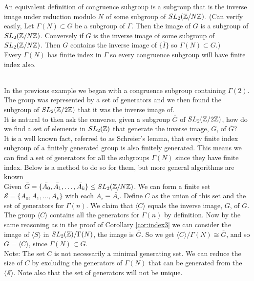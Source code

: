An equivalent definition of congruence subgroup is a subgroup that is the inverse image under reduction modulo $N$ of some subgroup of $\sltznz$. (Can verify easily, Let $\Gamma(N) \subset G$ be a subgroup of $\Gamma$. Then the image of $G$ is a subgroup of $\sltznz$. Conversely if $G$ is the inverse image of some subgroup of $\sltznz$. Then $G$ contains the inverse image of $\{\bar{I}\}$ so $\Gamma(N) \subset G$.)\\
Every $\Gamma(N)$ has finite index in $\Gamma$ so every congruence subgroup will have finite index also. \\
\\
\begin{remark}
In the previous example we began with a congruence subgroup containing $\Gamma(2)$. The group was represented by a set of generators and we then found the subgroup of $\sltznz[2]$ that it was the inverse image of. \\
It is natural to then ask the converse, given a subgroup $\bar{G}$ of $\sltznz[2]$, how do we find a set of elements in $\sltz$ that generate the inverse image, $G$,  of $\bar{G}$? \\

It is a well known fact, referred to as Schreier's lemma, that every finite index subgroup of a finitely generated group is also finitely generated. This means we can find a set of generators for all the subgroups $\Gamma(N)$ since they have finite index. Below is a method to do so for them, but more general algorithms are known \citep{seressPermutation}
\\
Given $\bar{G} = \{\bar{A_0}, \bar{A_1}, \ldots, \bar{A_k}\} \leq \sltznz$. We can form a finite set $\mathcal{S} = \{A_0, A_1, \ldots , A_k\}$ with each $A_i \equiv \bar{A_i}$. Define $C$ as the union of this set and the set of generators for $\Gamma(n)$. We claim that $\langle C \rangle$ equals the inverse image, $G$, of $\bar{G}$. \\
The group $\langle C \rangle$ contains all the generators for $\Gamma(n)$ by definition. Now by the same reasoning as in the proof of Corollary \ref{cor:index3} we can consider the image of $\langle S \rangle$ in $\sltz / \Gamma(N)$, the image is $\bar{G}$. So we get $\langle C \rangle / \Gamma(N) \cong \bar{G}$, and so $G = \langle C \rangle$, since $\Gamma(N) \subset G$.\\
Note: The set $C$ is not necessarily a minimal generating set. We can reduce the size of $C$ by excluding the generators of $\Gamma(N)$ that can be generated from the $\langle \mathcal{S} \rangle$. Note also that the set of generators will not be unique.
\end{remark}


